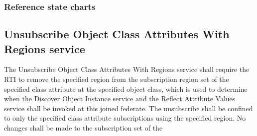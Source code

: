 \begin{compactstdpage}
    \subsubsection{Reference state charts}


    \subsection{Unsubscribe Object Class Attributes With Regions service}

    The Unsubscribe Object Class Attributes With Regions service shall require the RTI to remove the specified region from the subscription region set of the specified class attribute at the specified object class, which is used to determine when the Discover Object Instance \rtiinitiated{} service and the Reflect Attribute Values \rtiinitiated{} service shall be invoked at this joined federate. The unsubscribe shall be confined to only the specified class attribute subscriptions using the specified region. No changes shall be made to the subscription set of the


\end{compactstdpage}

\clearpage

